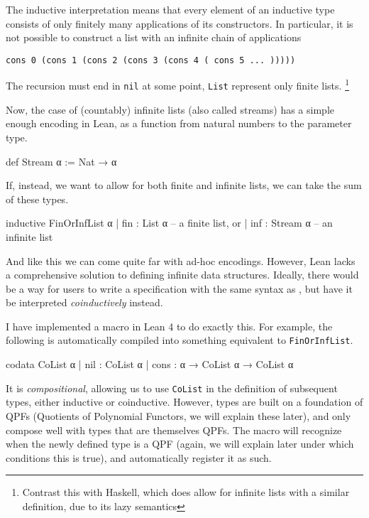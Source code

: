 \documentclass[titlepage]{report}
\newcommand\inductive{\lean{inductive}}
\newcommand\codata{\lean{codata}}
\begin{document}
The inductive interpretation means that every element of an inductive type consists of only
finitely many applications of its constructors. In particular, it is not possible
to construct a list with an infinite chain of  applications
\begin{center}
    \texttt{cons 0 (cons 1 (cons 2 (cons 3 (cons 4 ( cons 5 ... )))))}
\end{center}
The recursion must end in \texttt{nil} at some point, \texttt{List} represent only finite lists.
\footnote{Contrast this with Haskell, which does allow for infinite lists with a similar definition, due to its lazy semantics}


Now, the case of (countably) infinite lists (also called streams) has a simple enough encoding in Lean, as a function from natural numbers to the parameter type.
\begin{leancode}
    def Stream α := Nat → α
\end{leancode}

If, instead, we want to allow for both finite and infinite lists, we can take the sum of these types.
\begin{leancode}
    inductive FinOrInfList α
    | fin : List α      -- a finite list, or
    | inf : Stream α    -- an infinite list
\end{leancode}

And like this we can come quite far with ad-hoc encodings. 
However, Lean lacks a comprehensive solution to defining infinite data structures.
Ideally, there would be a way for users to write a specification with the same syntax as
\inductive, but have it be interpreted \emph{coinductively} instead.

I have implemented a \codata macro in Lean 4 to do exactly this.
For example, the following is automatically compiled into something equivalent to \texttt{FinOrInfList}.

\begin{leancode}
    codata CoList α 
    | nil  : CoList α
    | cons : α → CoList α → CoList α
\end{leancode}

It is \emph{compositional}, allowing us to use \texttt{CoList} in the definition of subsequent types, either inductive or coinductive.
However, \codata types are built on a foundation of QPFs (Quotients of Polynomial Functors, we will explain these later), and only compose well with types that are themselves QPFs. 
The \codata macro will recognize when the newly defined type is a QPF (again, we will explain later under which conditions this is true), and automatically register it as such.
\end{document}
